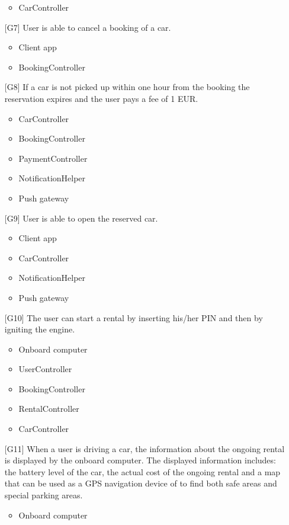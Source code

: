 \begin{itemize}
\begin{itemize}
			\item CarController
		\end{itemize}
	\item[{[G7]}] User is able to cancel a booking of a car.
		\begin{itemize}
			\item Client app
			\item BookingController
		\end{itemize}
	\item[{[G8]}] If a car is not picked up within one hour from the booking the reservation expires and the user pays a fee of 1 EUR.
		\begin{itemize}
			\item CarController
			\item BookingController
			\item PaymentController
			\item NotificationHelper
			\item Push gateway
		\end{itemize}
	\item[{[G9]}] User is able to open the reserved car.
		\begin{itemize}
			\item Client app
			\item CarController
			\item NotificationHelper
			\item Push gateway
		\end{itemize}
	\item[{[G10]}] The user can start a rental by inserting his/her PIN and then by igniting the engine.
		\begin{itemize}
			\item Onboard computer
			\item UserController
			\item BookingController
			\item RentalController
			\item CarController
		\end{itemize}
	\item[{[G11]}] When a user is driving a car, the information about the ongoing rental is displayed by the onboard computer. The displayed information includes: the battery level of the car, the actual cost of the ongoing rental and a map that can be used as a GPS navigation device of to find both safe areas and special parking areas.
		\begin{itemize}
			\item Onboard computer

\end{itemize}
\end{itemize}

